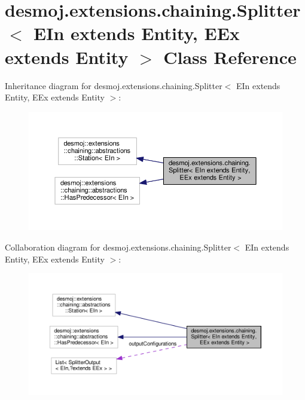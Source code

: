 \section{desmoj.\-extensions.\-chaining.\-Splitter$<$ E\-In extends Entity, E\-Ex extends Entity $>$ Class Reference}
\label{classdesmoj_1_1extensions_1_1chaining_1_1_splitter_3_01_e_in_01extends_01_entity_00_01_e_ex_01extends_01_entity_01_4}


Inheritance diagram for desmoj.\-extensions.\-chaining.\-Splitter$<$ E\-In extends Entity, E\-Ex extends Entity $>$\-:
\nopagebreak
\begin{figure}[H]
\begin{center}
\leavevmode
\includegraphics[width=350pt]{classdesmoj_1_1extensions_1_1chaining_1_1_splitter_3_01_e_in_01extends_01_entity_00_01_e_ex_01exfbcb743604aec38d997c1e727d6e93d6}
\end{center}
\end{figure}


Collaboration diagram for desmoj.\-extensions.\-chaining.\-Splitter$<$ E\-In extends Entity, E\-Ex extends Entity $>$\-:
\nopagebreak
\begin{figure}[H]
\begin{center}
\leavevmode
\includegraphics[width=350pt]{classdesmoj_1_1extensions_1_1chaining_1_1_splitter_3_01_e_in_01extends_01_entity_00_01_e_ex_01ex8c323dae5fc9fc90c285ed4d34223325}
\end{center}
\end{figure}
